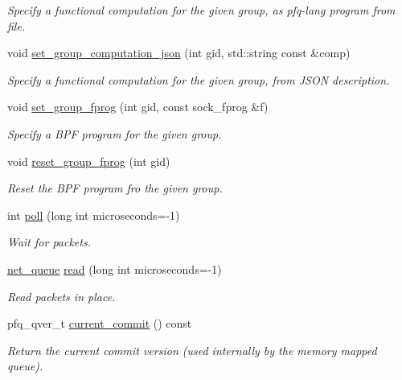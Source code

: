 \begin{DoxyCompactItemize}
\begin{DoxyCompactList}\small\item\em Specify a functional computation for the given group, as pfq-\/lang program from file. \end{DoxyCompactList}\item 
void \hyperlink{classpfq_1_1socket_ac60650eec56374ac4be3c69b43255b85}{set\+\_\+group\+\_\+computation\+\_\+json} (int gid, std\+::string const \&comp)
\begin{DoxyCompactList}\small\item\em Specify a functional computation for the given group, from J\+S\+ON description. \end{DoxyCompactList}\item 
void \hyperlink{classpfq_1_1socket_ad618894910a12a08eaed3d8668db25af}{set\+\_\+group\+\_\+fprog} (int gid, const sock\+\_\+fprog \&f)
\begin{DoxyCompactList}\small\item\em Specify a B\+PF program for the given group. \end{DoxyCompactList}\item 
void \hyperlink{classpfq_1_1socket_a2327e71a6f94e54efb0da5ec36b1c620}{reset\+\_\+group\+\_\+fprog} (int gid)
\begin{DoxyCompactList}\small\item\em Reset the B\+PF program fro the given group. \end{DoxyCompactList}\item 
int \hyperlink{classpfq_1_1socket_ad8ce551ea07f39317bb383ab88d66344}{poll} (long int microseconds=-\/1)
\begin{DoxyCompactList}\small\item\em Wait for packets. \end{DoxyCompactList}\item 
\hyperlink{classpfq_1_1net__queue}{net\+\_\+queue} \hyperlink{classpfq_1_1socket_a6004249d3abfe8a2329b44ba797d1909}{read} (long int microseconds=-\/1)
\begin{DoxyCompactList}\small\item\em Read packets in place. \end{DoxyCompactList}\item 
pfq\+\_\+qver\+\_\+t \hyperlink{classpfq_1_1socket_ada49e068e1b04c22838a3fae5d629590}{current\+\_\+commit} () const
\begin{DoxyCompactList}\small\item\em Return the current commit version (used internally by the memory mapped queue). \end{DoxyCompactList}\item 

\end{DoxyCompactItemize}
